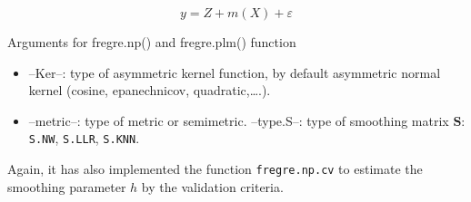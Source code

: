\documentclass[
]{book}
\newenvironment{Shaded}{\begin{snugshade}}{\end{snugshade}}
\newcommand{\AttributeTok}[1]{\textcolor[rgb]{0.77,0.63,0.00}{#1}}
\newcommand{\DecValTok}[1]{\textcolor[rgb]{0.00,0.00,0.81}{#1}}
\newcommand{\FunctionTok}[1]{\textcolor[rgb]{0.00,0.00,0.00}{#1}}
\newcommand{\NormalTok}[1]{#1}
\newcommand{\OtherTok}[1]{\textcolor[rgb]{0.56,0.35,0.01}{#1}}
\newcommand{\SpecialCharTok}[1]{\textcolor[rgb]{0.00,0.00,0.00}{#1}}
\newcommand{\StringTok}[1]{\textcolor[rgb]{0.31,0.60,0.02}{#1}}
\providecommand{\tightlist}{%
  \setlength{\itemsep}{0pt}\setlength{\parskip}{0pt}}
\begin{document}
\[y = Z + m(X) + \varepsilon\]

Arguments for fregre.np() and fregre.plm() function

\begin{itemize}
\tightlist
\item
  --Ker--: type of asymmetric kernel function, by default asymmetric normal kernel (cosine, epanechnicov, quadratic,\ldots.).
\item
  --metric--: type of metric or semimetric.
  --type.S--: type of smoothing matrix \(\mathbf{S}\): \texttt{S.NW}, \texttt{S.LLR}, \texttt{S.KNN}.
\end{itemize}

\begin{Shaded}
\end{Shaded}

Again, it has also implemented the function \texttt{fregre.np.cv} to estimate the smoothing parameter \(h\) by the validation criteria.

\begin{Shaded}
\end{Shaded}
\end{document}

